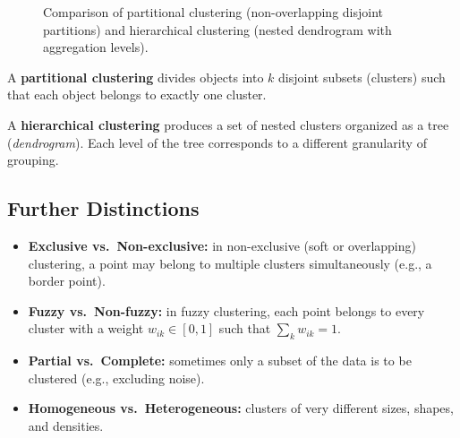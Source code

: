 \begin{figure}[htbp]
{%
}
\caption{Comparison of partitional clustering (non-overlapping disjoint partitions) and hierarchical clustering (nested dendrogram with aggregation levels).}
\label{fig:partitional-vs-hierarchical}
\end{figure}

\begin{definition}
A \textbf{partitional clustering} divides objects into $k$ disjoint subsets (clusters) such that each object belongs to exactly one cluster.
\end{definition}

\begin{definition}
A \textbf{hierarchical clustering} produces a set of nested clusters organized as a tree (\textit{dendrogram}). Each level of the tree corresponds to a different granularity of grouping.
\end{definition}

\subsection{Further Distinctions}

\begin{itemize}
  \item \textbf{Exclusive vs.\ Non-exclusive:} in non-exclusive (soft or overlapping) clustering, a point may belong to multiple clusters simultaneously (e.g., a border point).
  \item \textbf{Fuzzy vs.\ Non-fuzzy:} in fuzzy clustering, each point belongs to every cluster with a weight $w_{ik} \in [0,1]$ such that $\sum_k w_{ik} = 1$.
  \item \textbf{Partial vs.\ Complete:} sometimes only a subset of the data is to be clustered (e.g., excluding noise).
  \item \textbf{Homogeneous vs.\ Heterogeneous:} clusters of very different sizes, shapes, and densities.
\end{itemize}

